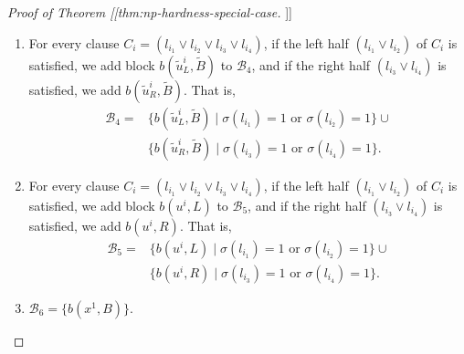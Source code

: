 \documentclass[fontsize=11pt,paper=a4]{book}
\begin{document}
\begin{proof}[Proof of Theorem [[thm:np-hardness-special-case]]]
\begin{enumerate}
\begin{enumerate}
\item if \(l_{i_1}\) evaluates to \(1\), we add block \(b(u_L^i,\tilde{L})\) to \(\mathscr{B}_3\),

\item if \(l_{i_2}\) evaluates to \(1\), we add \(b(u_L^i,\tilde{R})\),

\item if \(l_{i_3}\) evaluates to \(1\), we add \(b(u_R^i,\tilde{L})\), and

\item if \(l_{i_4}\) evaluates to \(1\), we add \(b(u_R^i,\tilde{R})\).
\end{enumerate}

That is,
\begin{align*}
\mathscr{B}_3=&\{b(u_L^i,\tilde{L})\mid\sigma(l_{i_1})=1\}\cup
\{b(u_L^i,\tilde{R})\mid\sigma(l_{i_2})=1\}\cup\\
&\{b(u_R^i,\tilde{L})\mid\sigma(l_{i_3})=1\}\cup
\{b(u_R^i,\tilde{R})\mid\sigma(l_{i_4})=1\}.
\end{align*}

\item For every clause \(C_i=(l_{i_1}\vee l_{i_2}\vee l_{i_3}\vee l_{i_4})\), if the left half \((l_{i_1}\vee l_{i_2})\) of \(C_i\) is satisfied, we add block \(b(\tilde{u}_L^i,\tilde{B})\) to \(\mathscr{B}_4\), and if the right half \((l_{i_3}\vee l_{i_4})\) is satisfied, we add \(b(\tilde{u}_R^i,\tilde{B})\).
That is,
\begin{align*}
\mathscr{B}_4=&\{b(\tilde{u}_L^i,\tilde{B})\mid\sigma(l_{i_1})=1\text{ or }\sigma(l_{i_2})=1\}\cup\\
&\{b(\tilde{u}_R^i,\tilde{B})\mid\sigma(l_{i_3})=1\text{ or }\sigma(l_{i_4})=1\}.
\end{align*}

\item For every clause \(C_i=(l_{i_1}\vee l_{i_2}\vee l_{i_3}\vee l_{i_4})\), if the left half \((l_{i_1}\vee l_{i_2})\) of \(C_i\) is satisfied, we add block \(b(u^i,L)\) to \(\mathscr{B}_5\), and if the right half \((l_{i_3}\vee l_{i_4})\) is satisfied, we add \(b(u^i,R)\).
That is,
\begin{align*}
\mathscr{B}_5=&\{b(u^i,L)\mid\sigma(l_{i_1})=1\text{ or }\sigma(l_{i_2})=1\}\cup\\
&\{b(u^i,R)\mid\sigma(l_{i_3})=1\text{ or }\sigma(l_{i_4})=1\}.
\end{align*}

\item \(\mathscr{B}_6=\{b(x^1,B)\}\).


\end{enumerate}
\end{proof}
\end{document}

